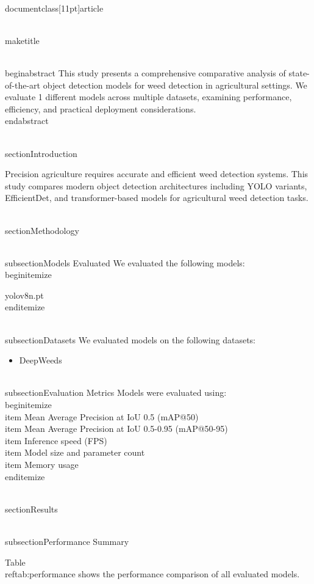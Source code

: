 \\documentclass[11pt]{article}
\begin{document}
\\maketitle

\\begin{abstract}
This study presents a comprehensive comparative analysis of state-of-the-art object detection models for weed detection in agricultural settings. We evaluate 1 different models across multiple datasets, examining performance, efficiency, and practical deployment considerations.
\\end{abstract}

\\section{Introduction}

Precision agriculture requires accurate and efficient weed detection systems. This study compares modern object detection architectures including YOLO variants, EfficientDet, and transformer-based models for agricultural weed detection tasks.

\\section{Methodology}

\\subsection{Models Evaluated}
We evaluated the following models:
\\begin{itemize}
\item yolov8n.pt
\\end{itemize}

\\subsection{Datasets}
We evaluated models on the following datasets:
\begin{itemize}
\item DeepWeeds
\end{itemize}

\\subsection{Evaluation Metrics}
Models were evaluated using:
\\begin{itemize}
\\item Mean Average Precision at IoU 0.5 (mAP@50)
\\item Mean Average Precision at IoU 0.5-0.95 (mAP@50-95)
\\item Inference speed (FPS)
\\item Model size and parameter count
\\item Memory usage
\\end{itemize}

\\section{Results}

\\subsection{Performance Summary}

Table~\\ref{tab:performance} shows the performance comparison of all evaluated models.
\end{document}
